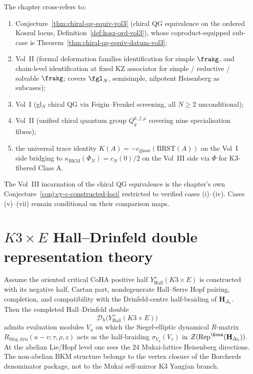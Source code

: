 \begin{remark}
\label{rem:vol3-comparison-theorems}
The chapter cross-refers to:
\begin{enumerate}[label=(\alph*)]
 \item Conjecture~\ref{thm:chiral-qg-equiv-vol3} (chiral QG
 equivalence on the ordered Koszul locus,
 Definition~\ref{def:kosz-ord-vol3}), whose
 coproduct-equipped sub-case is
 Theorem~\ref{thm:chiral-qg-equiv-datum-vol3};
 \item Vol~II \cite{VolII} (formal deformation
 families identification for simple $\frakg$, and
 chain-level identification at fixed KZ associator for
 simple / reductive / solvable $\frakg$; covers $\fgl_N$,
 semisimple, nilpotent Heisenberg as subcases);
 \item Vol~I \cite{VolI}
 (gl$_N$ chiral QG via Feigin--Frenkel screening, all
 $N \geq 2$ unconditional);
 \item Vol~II \cite{VolII}
 (unified chiral quantum group $Q_g^{k,f,\mu}$ covering
 nine specialisation fibres);
\item the universal trace identity
$K(A) = -c_{\mathrm{ghost}}(\mathrm{BRST}(A))$ on the Vol~I
 side bridging to $\kappa_{\mathrm{BKM}}(\Phi_N) = c_N(0)/2$
 on the Vol~III side via $\Phi$ for K3-fibered Class A.
\end{enumerate}
The Vol~III incarnation of the chiral QG equivalence is the
chapter's own
Conjecture~\ref{conj:cy-c-constructed-loci} restricted to verified
cases (i)--(iv). Cases (v)--(vii) remain conditional on their comparison maps.
\end{remark}

\section{\texorpdfstring{$K3 \times E$}{K3 x E} Hall--Drinfeld double representation theory}
\label{sec:qgreps-supplement}

\begin{conjecture}
\label{rem:qgreps-hall-drinfeld-reps}
Assume the oriented critical CoHA positive half
$Y^+_{\mathrm{Hall}}(K3\times E)$ is constructed with its negative
half, Cartan part, nondegenerate Hall--Serre Hopf pairing, completion,
and compatibility with the Drinfeld-centre half-braiding of
$\mathbf{H}_{\Delta_5}$. Then the completed Hall--Drinfeld double
\[
 \mathcal{D}_\hbar\bigl(Y^+_{\mathrm{Hall}}(K3\times E)\bigr)
\]
admits evaluation modules $V_u$ on which the Siegel-elliptic dynamical
$R$-matrix $R_{\mathrm{Sieg,dyn}}(u-v;\tau,\rho,z)$ acts as the
half-braiding $\sigma_{V_u}(V_v)$ in
$\mathcal{Z}(\mathrm{Rep}^{\Eone}(\mathbf{H}_{\Delta_5}))$. At the
abelian Lie/Hopf level one sees the $24$ Mukai-lattice Heisenberg
directions. The non-abelian BKM structure belongs to the vertex closure
of the Borcherds denominator package, not to the Mukai self-mirror K3
Yangian branch.
\end{conjecture}
